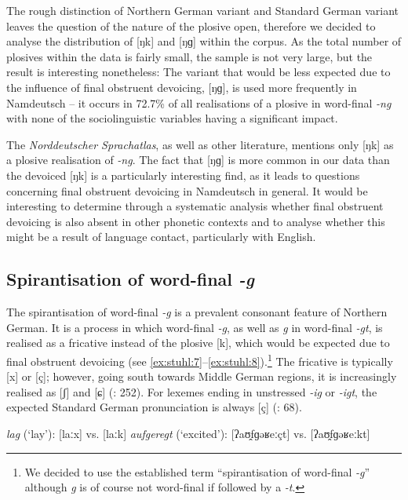 \documentclass[output=paper]{langsci/langscibook}
\begin{document}
The rough distinction of Northern German variant and Standard German variant leaves the question of the nature of the plosive open, therefore we decided to analyse the distribution of [ŋk] and [ŋɡ] within the corpus. As the total number of plosives within the data is fairly small, the sample is not very large, but the result is interesting nonetheless: The variant that would be less expected due to the influence of final obstruent devoicing, [ŋɡ], is used more frequently in Namdeutsch – it occurs in 72.7\% of all realisations of a plosive in word-final \textit{-ng} with none of the sociolinguistic variables having a significant impact.

The \textit{Norddeutscher Sprachatlas}, as well as other literature, mentions only [ŋk] as a plosive realisation of \textit{-ng}. The fact that [ŋɡ] is more common in our data than the devoiced [ŋk] is a particularly interesting find, as it leads to questions concerning final obstruent devoicing in Namdeutsch in general. It would be interesting to determine through a systematic analysis whether final obstruent devoicing is also absent in other phonetic contexts and to analyse whether this might be a result of language contact, particularly with English. 

\subsection{Spirantisation of word-final \textit{-g}}
\label{sec:stuhl:4.4}

The spirantisation of word-final \textit{-g} is a prevalent consonant feature of Northern German. It is a process in which word-final \textit{-g}, as well as \textit{g} in word-final \textit{-gt}, is realised as a fricative instead of the plosive [k], which would be expected due to final obstruent devoicing (see \ref{ex:stuhl:7}--\ref{ex:stuhl:8}).\footnote{We decided to use the established term “spirantisation of word-final \textit{-g}” although \textit{g} is of course not word-final if followed by a \textit{-t}.} The fricative is typically [x] or [ç]; however, going south towards Middle German regions, it is increasingly realised as [ʃ] and [ɕ] (\citealt{elmentaler_norddeutscher_2015}: 252). For lexemes ending in unstressed \textit{-ig} or \textit{-igt}, the expected Standard German pronunciation is always [ç] (\citealt{kleiner_duden_2015}: 68). 

 
\ea\label{ex:stuhl:7}   
\textit{lag} (‘lay’): {[laːx]} vs. {[laːk]}
 \ex\label{ex:stuhl:8} 
{\textit{aufgeregt}} (‘excited’): {[ʔaʊ̯⁠fɡəʁeːçt]} vs. {[ʔaʊ̯⁠fɡəʁeːkt]}
\z
 
\end{document}
